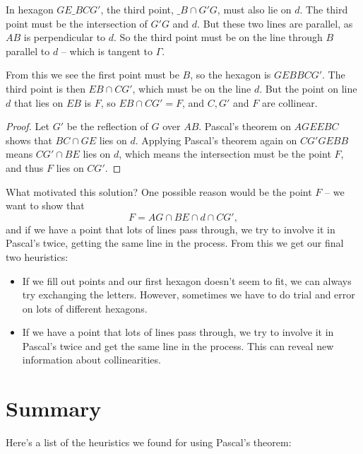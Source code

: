 \documentclass[11pt,paper=letter]{scrartcl}
\begin{document}
In hexagon $GE\_BCG'$, the third point, $\_B \cap G'G$, must also lie on $d$. The third point must be the intersection of $G'G$ and $d$. But these two lines are parallel, as $AB$ is perpendicular to $d$. So the third point must be on the line through $B$ parallel to $d$ -- which is tangent to $\Gamma$.

From this we see the first point must be $B$, so the hexagon is $GEBBCG'$. The third point is then $EB \cap CG'$, which must be on the line $d$. But the point on line $d$ that lies on $EB$ is $F$, so $EB \cap CG' = F$, and $C, G'$ and $F$ are collinear.

\begin{proof}
  Let $G'$ be the reflection of $G$ over $AB$. Pascal's theorem on $AGEEBC$ shows that $BC \cap GE$ lies on $d$. Applying Pascal's theorem again on $CG'GEBB$ means $CG' \cap BE$ lies on $d$, which means the intersection must be the point $F$, and thus $F$ lies on $CG'$.
\end{proof}

What motivated this solution? One possible reason would be the point $F$ -- we want to show that $$F = AG \cap BE \cap d \cap CG',$$ and if we have a point that lots of lines pass through, we try to involve it in Pascal's twice, getting the same line in the process. From this we get our final two heuristics:

\begin{itemize}
  \item If we fill out points and our first hexagon doesn't seem to fit, we can always try exchanging the letters. However, sometimes we have to do trial and error on lots of different hexagons.

  \item If we have a point that lots of lines pass through, we try to involve it in Pascal's twice and get the same line in the process. This can reveal new information about collinearities.
\end{itemize}

\section{Summary}

Here's a list of the heuristics we found for using Pascal's theorem:
\end{document}
